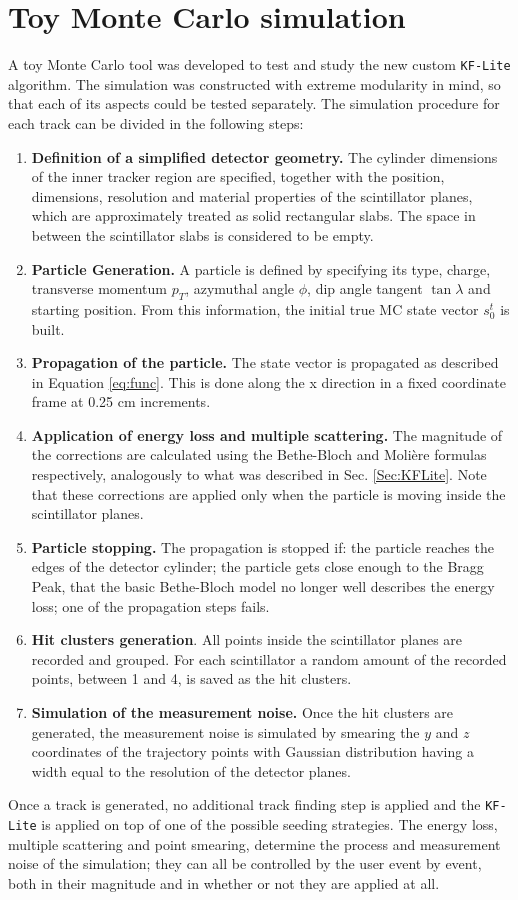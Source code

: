 \section{Toy Monte Carlo simulation}
\label{Sec:ToySim-Lite}

A toy Monte Carlo tool was developed to test and study the new custom \texttt{KF-Lite} algorithm. The simulation was constructed with extreme modularity in mind, so that each of its aspects could be tested separately. The simulation procedure for each track can be divided in the following steps:
\begin{enumerate}
    \item \textbf{Definition of a simplified detector geometry.} The cylinder dimensions of the inner tracker region are specified, together with the position, dimensions, resolution  and material properties of the scintillator planes, which are approximately treated as solid rectangular slabs. The space in between the scintillator slabs is considered to be empty.
    \item \textbf{Particle Generation.} A particle is defined by specifying its type, charge, transverse momentum $p_T$, azymuthal angle $\phi$, dip angle tangent $\tan\lambda$ and starting position. From this information, the initial true MC state vector $s_0^t$ is built.
    \item \textbf{Propagation of the particle.} The state vector is propagated as described in Equation \ref{eq:func}. This is done along the x direction in a fixed coordinate frame at 0.25 cm increments. 
    \item \textbf{Application of energy loss and multiple scattering.} The magnitude of the corrections are calculated using the Bethe-Bloch and Molière formulas respectively, analogously to what was described in Sec. \ref{Sec:KFLite}. Note that these corrections are applied only when the particle is moving inside the scintillator planes.
    \item \textbf{Particle stopping.} The propagation is stopped if: the particle reaches the edges of the detector cylinder; the particle gets close enough to the Bragg Peak, that the basic Bethe-Bloch model no longer well describes the energy loss; one of the propagation steps fails.
    \item \textbf{Hit clusters generation}. All points inside the scintillator planes are recorded and grouped. For each scintillator a random amount of the recorded points, between 1 and 4, is saved as the hit clusters. 
    \item \textbf{Simulation of the measurement noise.} Once the hit clusters are generated, the measurement noise is simulated by smearing the $y$ and $z$ coordinates of the trajectory points with Gaussian distribution having a width equal to the resolution of the detector planes. 
\end{enumerate}
Once a track is generated, no additional track finding step is applied and the \texttt{KF-Lite} is applied on top of one of the possible seeding strategies. The energy loss, multiple scattering and point smearing, determine the process and measurement noise of the simulation; they can all be controlled by the user event by event, both in their magnitude and in whether or not they are applied at all. 


